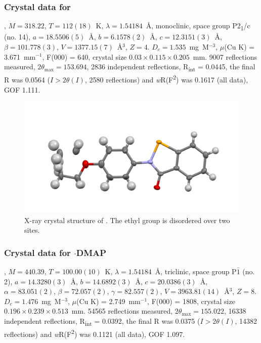 \begin{refsection}
\subsubsection{Crystal data for \texorpdfstring{}{C15 H13 N O2 Se}}
, $M=318.22$, $T=112(18)$~K, $\lambda=1.54184$~\AA, monoclinic, space group P2\textsubscript{1}/c (no. 14), $a = 18.5506(5)$~\AA, $b = 6.1578(2)$~\AA, $c = 12.3151(3)$~\AA, $\beta = 101.778(3)$\degree, $V = 1377.15(7)$~\AA$^{3}$, $Z = 4$. $D_{c}= 1.535$~mg~M$^{-3}$, $\mu$(Cu K\a) = 3.671~mm$^{-1}$, F(000) = 640, crystal size $0.03 \times 0.115 \times 0.205$~mm. 9007 reflections measured, $2\theta_{\max}=153.694$\degree, 2836 independent reflections, R\textsubscript{int} = 0.0445, the final R was 0.0564 ($I > 2\theta(I)$, 2580 reflections) and \textit{w}R(F\textsuperscript{2}) was 0.1617 (all data), GOF 1.111.

\begin{figure}
  \includegraphics[width=0.6\linewidth]{Figures/ebs-4oet-xtal.pdf}
  \caption[X-ray crystal structure of \texorpdfstring{}{C15 H13 N O2 Se}.]{X-ray crystal structure of \texorpdfstring{}{C15 H13 N O2 Se}. The ethyl group is disordered over two sites.}
\end{figure}

\subsubsection{Crystal data for \texorpdfstring{$ \cdot $DMAP}{C22 H23 N3 O2 Se}}
, $M=440.39$, $T=100.00(10)$~K, $\lambda=1.54184$~\AA, triclinic, space group P$\bar{1}$ (no. 2), $a = 14.3280(3)$~\AA, $b = 14.6892(3)$~\AA, $c = 20.0386(3)$~\AA, $\alpha = 83.051(2)$\degree, $\beta = 72.057(2)$\degree, $\gamma = 82.557(2)$\degree, $V = 3963.81(14)$~\AA$^{3}$, $Z = 8$. $D_{c}= 1.476$~mg~M$^{-3}$, $\mu$(Cu K\a) = 2.749~mm$^{-1}$, F(000) = 1808, crystal size $0.196 \times 0.239 \times 0.513$~mm. 54565 reflections measured, $2\theta_{\max}=155.022$\degree, 16338 independent reflections, R\textsubscript{int} = 0.0392, the final R was 0.0375 ($I > 2\theta(I)$, 14382 reflections) and \textit{w}R(F\textsuperscript{2}) was 0.1121 (all data), GOF 1.097.


\end{refsection}
